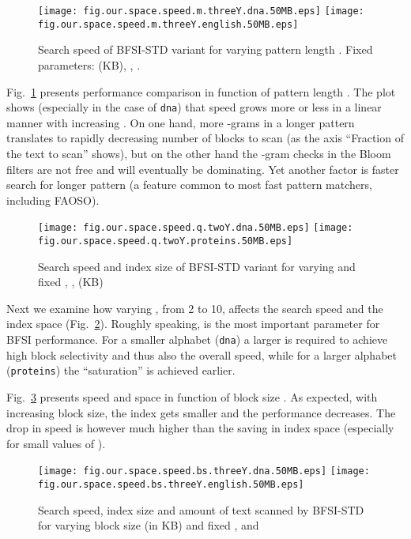 \documentclass{llncs}
\begin{document}
\begin{figure}[pt]
\centerline{
\texttt{[image: fig.our.space.speed.m.threeY.dna.50MB.eps]}
\texttt{[image: fig.our.space.speed.m.threeY.english.50MB.eps]}
}
\caption[Results]
{Search speed of BFSI-STD variant for varying pattern length . Fixed parameters:  (KB), , .}
\label{fig:speed_space_m_threeY}
\end{figure}


Fig.~\ref{fig:speed_space_m_threeY} presents performance comparison 
in function of pattern length . 
The plot shows (especially in the case of \texttt{dna}) that speed 
grows more or less in a linear manner with increasing .
On one hand, more -grams in a longer pattern translates to rapidly 
decreasing number of blocks to scan (as the axis ``Fraction of the text 
to scan'' shows), but on the other hand the -gram checks in the Bloom filters 
are not free and will eventually be dominating.
Yet another factor 
is faster 
search for longer 
pattern (a feature common to most fast pattern matchers, including FAOSO).


\begin{figure}[pt]
\centerline{
\texttt{[image: fig.our.space.speed.q.twoY.dna.50MB.eps]}
\texttt{[image: fig.our.space.speed.q.twoY.proteins.50MB.eps]}
}
\caption[Results]
{Search speed and index size of BFSI-STD variant for varying  and fixed 
, ,  (KB)}
\label{fig:speed_space_q_twoY}
\end{figure}


Next we examine how varying , from 2 to 10, affects 
the search speed and the index space (Fig.~\ref{fig:speed_space_q_twoY}).
Roughly speaking,  is the most important parameter for BFSI performance.
For a smaller alphabet (\texttt{dna}) a larger  is required to achieve 
high block selectivity and thus also the overall speed, while for a larger alphabet (\texttt{proteins})
the ``saturation'' is achieved earlier.



Fig.~\ref{fig:speed_space_bs_threeY} presents speed and space in function of block size .
As expected, with increasing block size, the index gets smaller and the performance decreases. 
The drop in speed is however much higher than the saving in index space 
(especially for small values of ). 



\begin{figure}[pt]
\centerline{
\texttt{[image: fig.our.space.speed.bs.threeY.dna.50MB.eps]}
\texttt{[image: fig.our.space.speed.bs.threeY.english.50MB.eps]}
}
\caption[Results]
{Search speed, index size and amount of text scanned by BFSI-STD for varying block size  (in KB) and fixed ,  and }
\label{fig:speed_space_bs_threeY}
\end{figure}
\end{document}
